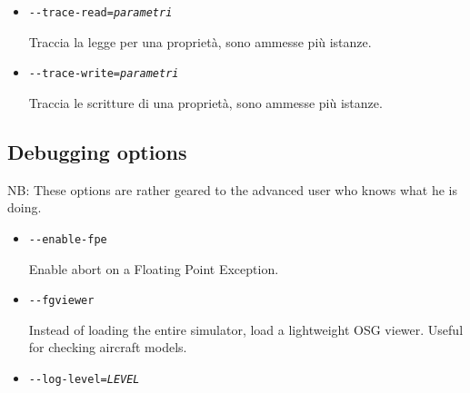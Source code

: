 \begin{itemize}
{\begin{itemize}
  Assegna un determinato valore ad una propriet\`{a}. Si pu\`{o} opzionalmente
  specificare il tipo di propriet\`{a} (\texttt{double}, \texttt{string}, \texttt{boolean}).

  Esempio: \texttt{-$ $-prop:/engines/engine[0]/running=true} starts the simulator with running engines.

  Altro esempio:

  \texttt{-$ $-aircraft=c172p}\\
  \texttt{-$ $-prop:/consumables/fuels/tank[0]/level-gal=10}\\
  \texttt{-$ $-prop:/consumables/fuels/tank[1]/level-gal=10}\\

  (riempie il Cessna di carburante per un breve volo).

  \item{\texttt{-$ $-trace-read={\it parametri}}}

  Traccia la legge per una propriet\`{a}, sono ammesse pi\`{u} istanze.

  \item{\texttt{-$ $-trace-write={\it parametri}}}

  Traccia le scritture di una propriet\`{a}, sono ammesse pi\`{u} istanze.
  \end{itemize}
}
{

  \subsection{Debugging options}

  NB: These options are rather geared to the advanced user who knows what he is doing.

  \begin{itemize}

  \item{\texttt{-$ $-enable-fpe}}

  Enable abort on a Floating Point Exception.

  \item{\texttt{-$ $-fgviewer}}

  Instead of loading the entire simulator, load a lightweight OSG viewer. Useful for checking aircraft
  models.

  \item{\texttt{-$ $-log-level={\it LEVEL}}}


\end{itemize}}
\end{itemize}
